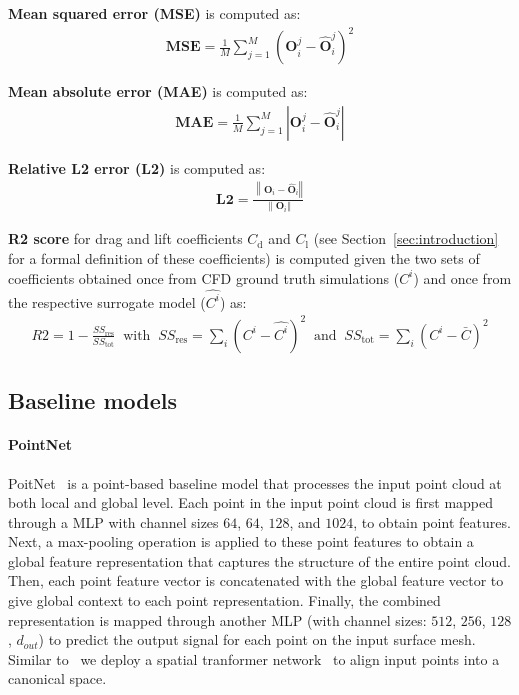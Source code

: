 \textbf{Mean squared error (MSE)} is computed as:
\begin{align}
    \mathbf{MSE} = \frac{1}{M} \sum_{j=1}^M (\bm{O}_{i}^{j} - \hat{\bm{O}}_{i}^{j})^2
\end{align}

\textbf{Mean absolute error (MAE)} is computed as:
\begin{align}
    \mathbf{MAE} = \frac{1}{M} \sum_{j=1}^M | \bm{O}_{i}^{j} - \hat{\bm{O}}_{i}^{j} |
\end{align}

\textbf{Relative L2 error (L2)} is computed as:
\begin{align}
    \mathbf{L2} = \frac{\left\lVert \bm{O}_{i} - \hat{\bm{O}}_{i} \right\Vert}{\left\lVert \bm{O}_{i} \right\Vert}
\end{align}

\textbf{R2 score} for drag and lift coefficients $C_\text{d}$ and $C_\text{l}$
(see Section~\ref{sec:introduction} for a formal definition of these coefficients) is computed given
the two sets of coefficients obtained once from \ac{CFD} ground truth simulations ($C^i$)
and once from the respective surrogate model ($\hat{C^i}$) as:
\begin{align}
    R2 = 1 - \frac{SS_\text{res}}{SS_\text{tot}} \;\; \text{with} \;\;  SS_\text{res} = \sum_i (C^i - \hat{C^i})^2 \;\; \text{and} \;\; SS_\text{tot} = \sum_i (C^i - \bar{C})^2
\end{align}

\subsection{Baseline models}
\paragraph{PointNet} PoitNet~\cite{qi2017pointnet} is a point-based baseline model that processes the input point cloud at both local and global level. 
Each point in the input point cloud is first mapped through a \ac{MLP} with channel sizes $64$, $64$, $128$, and $1024$, to obtain point features.
Next, a max-pooling operation is applied to these point features to obtain a global feature representation that captures the structure of the entire point cloud.
Then, each point feature vector is concatenated with the global feature vector to give global context to each point representation.
Finally, the combined representation is mapped through another \ac{MLP} (with channel sizes: $512$, $256$, $128$, $d_{out}$) to predict the output signal for each point on the input surface mesh.
Similar to~\cite{qi2017pointnet} we deploy a spatial tranformer network~\cite{jaderberg2015spatial} to align input points into a canonical space.

